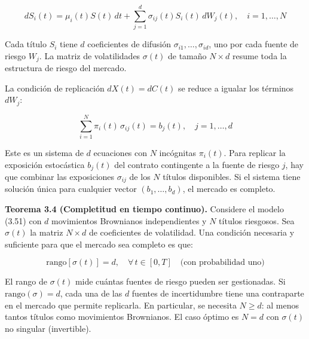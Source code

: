 \documentclass[12pt]{article}
\begin{document}
\begin{equation}
  dS_i(t) = \mu_i(t)S(t)\,dt + \sum_{j=1}^d \sigma_{ij}(t)S_i(t)\,dW_j(t), \quad i=1,\ldots,N
  \tag{3.51}
\end{equation}

\begin{intuicionmat}
Cada t\'itulo $S_i$ tiene $d$ coeficientes de difusi\'on $\sigma_{i1},\ldots,\sigma_{id}$, uno por cada fuente de riesgo $W_j$. La matriz de volatilidades $\sigma(t)$ de tama\~no $N \times d$ resume toda la estructura de riesgo del mercado.
\end{intuicionmat}

La condici\'on de replicaci\'on $dX(t) = dC(t)$ se reduce a igualar los t\'erminos $dW_j$:

\begin{equation}
  \sum_{i=1}^N \pi_i(t)\,\sigma_{ij}(t) = b_j(t), \quad j = 1,\ldots,d
\end{equation}

\begin{intuicionmat}
Este es un sistema de $d$ ecuaciones con $N$ inc\'ognitas $\pi_i(t)$. Para replicar la exposici\'on estoc\'astica $b_j(t)$ del contrato contingente a la fuente de riesgo $j$, hay que combinar las exposiciones $\sigma_{ij}$ de los $N$ t\'itulos disponibles. Si el sistema tiene soluci\'on \'unica para cualquier vector $(b_1,\ldots,b_d)$, el mercado es completo.
\end{intuicionmat}

\textbf{Teorema 3.4 (Completitud en tiempo continuo).} Considere el modelo (3.51) con $d$ movimientos Brownianos independientes y $N$ t\'itulos riesgosos. Sea $\sigma(t)$ la matriz $N \times d$ de coeficientes de volatilidad. Una condici\'on necesaria y suficiente para que el mercado sea completo es que:

\begin{equation}
  \text{rango}[\sigma(t)] = d, \quad \forall\, t \in [0,T] \quad \text{(con probabilidad uno)}
\end{equation}

\begin{intuicionmat}
El rango de $\sigma(t)$ mide cu\'antas fuentes de riesgo pueden ser gestionadas. Si $\text{rango}(\sigma) = d$, cada una de las $d$ fuentes de incertidumbre tiene una contraparte en el mercado que permite replicarla. En particular, se necesita $N \ge d$: al menos tantos t\'itulos como movimientos Brownianos. El caso \'optimo es $N = d$ con $\sigma(t)$ no singular (invertible).
\end{intuicionmat}
\end{document}
